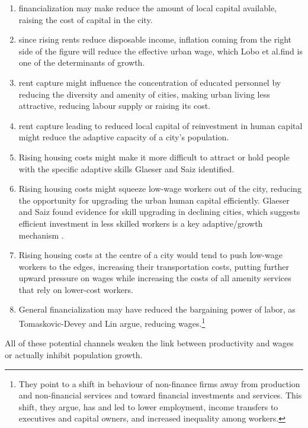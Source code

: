  
\begin{enumerate}
\item financialization may make reduce the amount of local capital available, raising the cost of capital in the city. 
    
\item since rising rents reduce disposable income, inflation coming from the right  side of the figure will reduce  the effective urban wage, which Lobo et al.find is one of the determinants of growth.

\item rent capture might influence the concentration of educated personnel by reducing the diversity and amenity of cities, making urban living less attractive, reducing labour supply or raising its cost.

\item rent capture leading to reduced local capital of reinvestment in human capital  might reduce the adaptive capacity of a city's population.

\item Rising housing costs might make it more difficult to attract or hold people with the specific adaptive skills Glaeser and Saiz identified.

\item  Rising housing costs might squeeze low-wage workers out of the city, reducing the opportunity for upgrading the urban human capital efficiently. Glaeser and Saiz found   evidence for skill upgrading  in declining cities, which suggests efficient investment in less skilled workers is a key adaptive/growth mechanism . 

\item Rising housing costs at the centre of a city would tend to push low-wage workers to the edges, increasing their transportation costs, putting further upward pressure on wages while increasing the costs of all amenity services that rely on lower-cost workers.

\item General financialization may have reduced the bargaining power of labor, as Tomaskovic-Devey and Lin  argue\cite{tomaskovic-deveyFinancializationCausesInequality2013}, reducing wages.\footnote{They point to a shift in behaviour of non-finance firms away from production and non-financial services and toward financial investments and services. This shift, they  argue,  has and led to lower employment, income transfers to executives and capital owners, and increased inequality among workers.\cite{tomaskovic-deveyFinancializationCausesInequality2013}} 
\end{enumerate}
All of these potential channels weaken the link between productivity and wages or actually inhibit population growth.


